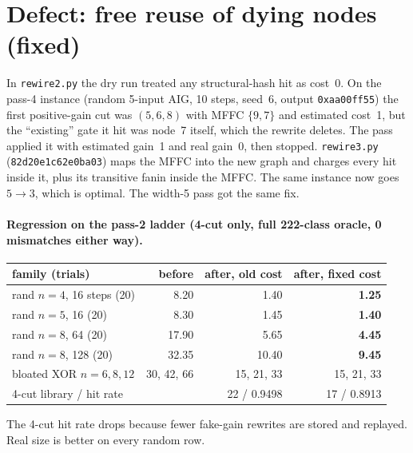 \documentclass[11pt]{article}
\begin{document}
\section{Defect: free reuse of dying nodes (fixed)}
In \texttt{rewire2.py} the dry run treated any structural-hash hit as cost~0. On the pass-4 instance (random 5-input AIG, 10 steps, seed~6, output \texttt{0xaa00ff55}) the first positive-gain cut was $(5,6,8)$ with MFFC $\{9,7\}$ and estimated cost~1, but the ``existing'' gate it hit was node~7 itself, which the rewrite deletes. The pass applied it with estimated gain~1 and real gain~0, then stopped. \texttt{rewire3.py} (\texttt{82d20e1c62e0ba03}) maps the MFFC into the new graph and charges every hit inside it, plus its transitive fanin inside the MFFC. The same instance now goes $5\to3$, which is optimal. The width-5 pass got the same fix.

\paragraph{Regression on the pass-2 ladder (4-cut only, full 222-class oracle, 0 mismatches either way).}
\begin{center}\begin{tabular}{lrrr}\toprule
family (trials) & before & after, old cost & after, fixed cost\\\midrule
rand $n{=}4$, 16 steps (20) & 8.20 & 1.40 & \textbf{1.25}\\
rand $n{=}5$, 16 (20) & 8.30 & 1.45 & \textbf{1.40}\\
rand $n{=}8$, 64 (20) & 17.90 & 5.65 & \textbf{4.45}\\
rand $n{=}8$, 128 (20) & 32.35 & 10.40 & \textbf{9.45}\\
bloated XOR $n=6,8,12$ & 30, 42, 66 & 15, 21, 33 & 15, 21, 33\\
4-cut library / hit rate & & 22 / 0.9498 & 17 / 0.8913\\\bottomrule
\end{tabular}\end{center}
The 4-cut hit rate drops because fewer fake-gain rewrites are stored and replayed. Real size is better on every random row.
\end{document}
